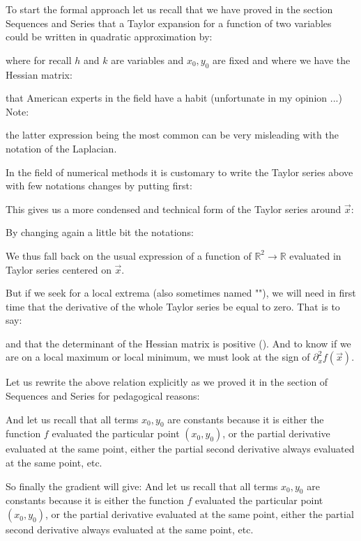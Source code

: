 	To start the formal approach let us recall that we have proved in the section Sequences and Series that a Taylor expansion for a function of two variables could be written in quadratic approximation by:
	
	where for recall $h$ and $k$ are variables and $x_0,y_0$ are fixed and where we have the Hessian matrix:
	
	that American experts in the field have a habit (unfortunate in my opinion ...) Note:
	
	the latter expression being the most common can be very misleading with the notation of the Laplacian.

	In the field of numerical methods it is customary to write the Taylor series above with few notations changes by putting first:
	
	This gives us a more condensed and technical form of the Taylor series around $\vec{x}$:
	
	By changing again a little bit the notations:
	
	We thus fall back on the usual expression of a function of $\mathbb{R}^2\rightarrow \mathbb{R}$ evaluated in Taylor series centered on $\vec{x}$.

	But if we seek for a local extrema (also sometimes named ""), we will need in first time that the derivative of the whole Taylor series be equal to zero. That is to say:
	
	and that the determinant of the Hessian matrix is positive (). And to know if we are on a local maximum or local minimum, we must look at the sign of $\partial_x^2 f(\vec{x})$.

	Let us rewrite the above relation explicitly as we proved it in the section of Sequences and Series for pedagogical reasons:
	
	And let us recall that all terms $x_0,y_0$ are constants because it is either the function $f$ evaluated the particular point $(x_0,y_0)$, or the partial derivative evaluated at the same point, either the partial second derivative always evaluated at the same point, etc.

	So finally the gradient will give:
	And let us recall that all terms $x_0,y_0$ are constants because it is either the function $f$ evaluated the particular point $(x_0,y_0)$, or the partial derivative evaluated at the same point, either the partial second derivative always evaluated at the same point, etc.

